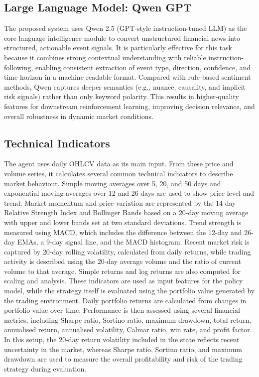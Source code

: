 \documentclass[a4paper,fleqn]{cas-sc}
\begin{document}
\subsection{Large Language Model: Qwen GPT}\label{sec:Large}
The proposed system uses Qwen 2.5 (GPT-style instruction-tuned LLM) as the core language intelligence module to convert unstructured financial news into structured, actionable event signals. It is particularly effective for this task because it combines strong contextual understanding with reliable instruction-following, enabling consistent extraction of event type, direction, confidence, and time horizon in a machine-readable format. Compared with rule-based sentiment methods, Qwen captures deeper semantics (e.g., nuance, causality, and implicit risk signals) rather than only keyword polarity. This results in higher-quality features for downstream reinforcement learning, improving decision relevance, and overall robustness in dynamic market conditions.
\subsection{Technical Indicators}\label{sec:Technical Indicators}
The agent uses daily OHLCV data as its main input. From these price and volume series, it calculates several common technical indicators to describe market behaviour. Simple moving averages over 5, 20, and 50 days and exponential moving averages over 12 and 26 days are used to show price level and trend. Market momentum and price variation are represented by the 14-day Relative Strength Index and Bollinger Bands based on a 20-day moving average with upper and lower bands set at two standard deviations. Trend strength is measured using MACD, which includes the difference between the 12-day and 26-day EMAs, a 9-day signal line, and the MACD histogram. Recent market risk is captured by 20-day rolling volatility, calculated from daily returns, while trading activity is described using the 20-day average volume and the ratio of current volume to that average. Simple returns and log returns are also computed for scaling and analysis.
These indicators are used as input features for the policy model, while the strategy itself is evaluated using the portfolio value generated by the trading environment. Daily portfolio returns are calculated from changes in portfolio value over time. Performance is then assessed using several financial metrics, including Sharpe ratio, Sortino ratio, maximum drawdown, total return, annualised return, annualised volatility, Calmar ratio, win rate, and profit factor. In this setup, the 20-day return volatility included in the state reflects recent uncertainty in the market, whereas Sharpe ratio, Sortino ratio, and maximum drawdown are used to measure the overall profitability and risk of the trading strategy during evaluation.
\end{document}
